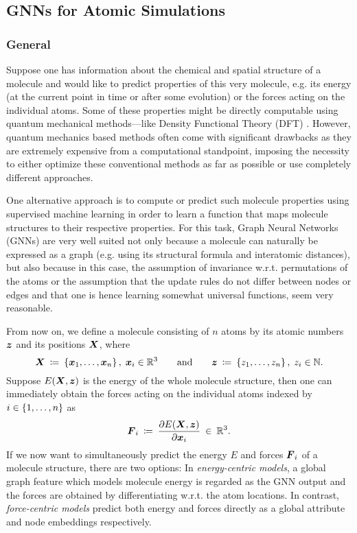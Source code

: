 \subsection{GNNs for Atomic Simulations}
\label{subsec:atomic-simulations}

\subsubsection{General}
\label{subsubsec:atomic-simulations-general}

Suppose one has information about the chemical and spatial structure of a molecule 
and would like to predict properties of this very molecule, e.g. its energy (at the 
current point in time or after some evolution) or the forces acting on the 
individual atoms. Some of these properties might be directly
computable using quantum mechanical methods---like Density Functional Theory (DFT) 
\cite{doi:10.1021/ed5004788}. However, quantum mechanics based methods often come
with significant drawbacks as they are extremely expensive from a computational 
standpoint, imposing the necessity to either optimize these conventional methods 
as far as possible or use completely different approaches.

One alternative approach is to compute or 
predict such molecule properties using supervised
machine learning in order to learn a function that maps molecule structures to their
respective properties. For this task, Graph
Neural Networks (GNNs) are very well suited not only because a molecule can naturally
be expressed as a graph (e.g. using its structural formula and
interatomic distances), but also because in this case, the 
assumption of invariance w.r.t. permutations of the atoms or the assumption that 
the update rules do not differ between nodes or edges and that one is hence
learning somewhat universal functions, seem very reasonable.

From now on, we define a molecule consisting of $n$ atoms by its atomic numbers 
$\boldsymbol{z}$ and its positions $\boldsymbol{X}$, where
\begin{equation}
    \boldsymbol{X} \: \coloneqq \: \left\{\boldsymbol{x}_1, \dots, \boldsymbol{x}_n\right\}, \; \boldsymbol{x}_i \in \mathbb{R}^3
    \qquad \text{and} \qquad 
    \boldsymbol{z} \: \coloneqq \: \left\{z_1, \dots, z_n\right\}, \; z_i \in \mathbb{N} \text{.}
    \label{eq:molecule_setup}
\end{equation}
Suppose $E(\boldsymbol{X}, \boldsymbol{z})$ is the energy of the whole molecule structure, then one can immediately
obtain the forces acting on the individual atoms indexed by $i \in \left\{1, \dots, n\right\}$ as
\[
    \boldsymbol{F}_i \: \coloneqq \: \frac{\partial E(\boldsymbol{X}, \boldsymbol{z})}{\partial \boldsymbol{x}_i} \: \in \: \mathbb{R}^3 \text{.}
\]
If we now want to simultaneously predict the energy $E$ and forces $\boldsymbol{F}_i$
of a molecule structure, there are two options: In \textit{energy-centric models}, 
a global graph feature which models molecule energy
is regarded as the GNN output and the forces are obtained by differentiating w.r.t.
the atom locations. In contrast, \textit{force-centric models} predict both energy and forces
directly as a global attribute and node embeddings respectively.

